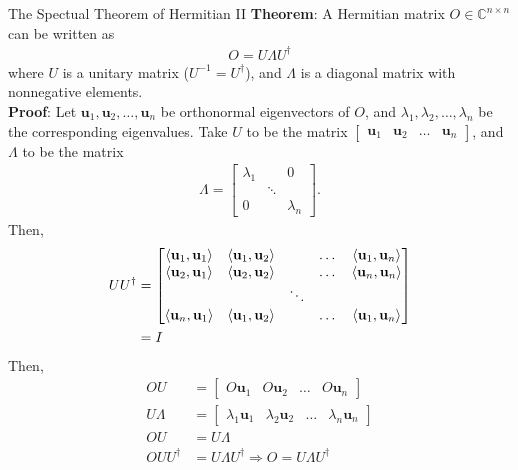 \documentclass{beamer}
\begin{document}
\begin{frame}{The Spectual Theorem of Hermitian II\tiny{\cite{thespectraltheoremforhermitianmatrice}}}
  {\tiny
    \textbf{Theorem}: A Hermitian matrix $O \in \mathbb{C}^{n \times n}$ can be written as
    \begin{align*}
      O = U \Lambda U^{\dagger}
    \end{align*}
    where $U$ is a unitary matrix ($U^{-1} = U^{\dagger}$), and $\Lambda$ is a diagonal matrix with nonnegative elements. \\
    \textbf{Proof}:
    Let $\mathbf{u}_1, \mathbf{u}_2, \dots, \mathbf{u}_n$ be orthonormal eigenvectors of $O$,
    and $\lambda_1, \lambda_2, \dots, \lambda_n$ be the corresponding eigenvalues.
    Take $U$ to be the matrix $\begin{bmatrix} \mathbf{u}_1 & \mathbf{u}_2 & \dots & \mathbf{u}_n\end{bmatrix}$,
    and $\Lambda$ to be the matrix
    \begin{align*}
      \Lambda =
                \begin{bmatrix}
                  \lambda_1 &  & 0 \\
                  & \ddots & \\
                  0 & &  \lambda_n
                \end{bmatrix}.
    \end{align*}
    Then,
    \begin{align*}
      UU^{\dagger} &= 
                \begin{bmatrix}
                  \braket{\mathbf{u}_1, \mathbf{u}_1} & \braket{\mathbf{u}_1, \mathbf{u}_2} &         & \dots & \braket{\mathbf{u}_1, \mathbf{u}_n} \\
                  \braket{\mathbf{u}_2, \mathbf{u}_1} & \braket{\mathbf{u}_2, \mathbf{u}_2} &         & \dots & \braket{\mathbf{u}_n, \mathbf{u}_n} \\
                                                      &                                     &  \ddots &       &                                     \\
                  \braket{\mathbf{u}_n, \mathbf{u}_1} & \braket{\mathbf{u}_1, \mathbf{u}_2} &         & \dots & \braket{\mathbf{u}_1, \mathbf{u}_n}
                \end{bmatrix} \\
                &= I
    \end{align*}
    Then,
    \begin{align*}
      OU &= \begin{bmatrix} O\mathbf{u}_1 & O\mathbf{u}_2 & \dots & O\mathbf{u}_n \end{bmatrix} \\
      U\Lambda &= \begin{bmatrix} \lambda_1 \mathbf{u}_1 & \lambda_2 \mathbf{u}_2 & \dots & \lambda_n \mathbf{u}_n \end{bmatrix} \\
      OU &= U\Lambda \\
      OUU^{\dagger} &= U\Lambda U^{\dagger} \Rightarrow O = U \Lambda U^{\dagger}
    \end{align*}
  }%
\end{frame}
\end{document}
